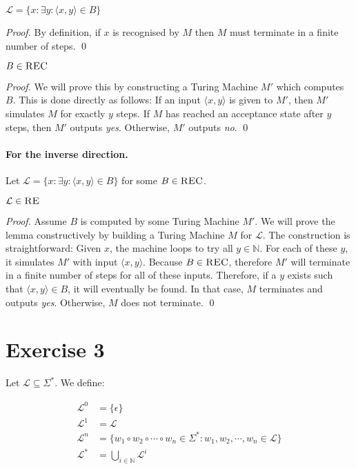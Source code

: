 \documentclass[11pt]{llncs}
\begin{document}
\begin{lemma}
$\mathcal{L} = \{x: \exists y: \langle x, y \rangle \in B\}$
\end{lemma}
\begin{proof}
By definition, if $x$ is recognised by $M$ then $M$ must terminate in a finite
number of steps.
\qed
\end{proof}
\begin{lemma}
$B \in \textsc{REC}$
\end{lemma}
\begin{proof}
We will prove this by constructing a Turing Machine $M'$ which computes $B$.
This is done directly as follows: If an input $\langle x, y \rangle$ is given to
$M'$, then $M'$ simulates $M$ for exactly $y$ steps. If $M$ has reached an
acceptance state after $y$ steps, then $M'$ outputs \textit{yes}. Otherwise,
$M'$ outputs \textit{no}.
\qed
\end{proof}

\paragraph{For the inverse direction.} Let  $\mathcal{L} = \{x: \exists y:
\langle x, y \rangle \in B\}$ for some $B \in \textsc{REC}$.

\begin{lemma}
$\mathcal{L} \in \textsc{RE}$
\end{lemma}
\begin{proof}
Assume $B$ is computed by some Turing Machine $M'$. We will prove the lemma
constructively by building a Turing Machine $M$ for $\mathcal{L}$. The
construction is straightforward: Given $x$, the machine loops to try all $y \in
\mathbb{N}$. For each of these $y$, it simulates $M'$ with input $\langle x, y
\rangle$. Because $B \in \textsc{REC}$, therefore $M'$ will terminate in a
finite number of steps for all of these inputs. Therefore, if a $y$ exists such
that $\langle x, y \rangle \in B$, it will eventually be found. In that case,
$M$ terminates and outputs \textit{yes}. Otherwise, $M$ does not terminate.
\qed
\end{proof}

\section*{Exercise 3}
Let $\mathcal{L} \subseteq \Sigma^*$. We define:

\begin{align*}
\mathcal{L}^0 &= \{\epsilon\}\\
\mathcal{L}^1 &= \mathcal{L}\\
\mathcal{L}^n &= \{w_1 \circ w_2 \circ \cdots \circ w_n \in \Sigma^*
  : w_1, w_2, \cdots, w_n \in \mathcal{L}\}\\
\mathcal{L}^* &= \bigcup_{i \in \mathbb{N}} \mathcal{L}^i
\end{align*}
\end{document}
